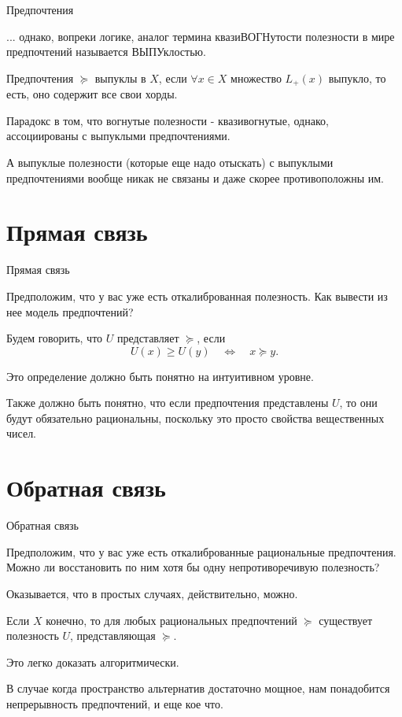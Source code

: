\documentclass{beamer}
\begin{document}
\begin{frame}{Предпочтения}

... однако, вопреки логике, аналог термина квазиВОГНутости полезности в мире предпочтений называется ВЫПУклостью.

\begin{definition}
Предпочтения $\succcurlyeq$ \alert{выпуклы} в $X$, если $\forall x \in X$ множество $L_{+}(x)$ выпукло, то есть, оно содержит все свои хорды. 
\end{definition}

Парадокс в том, что вогнутые полезности - квазивогнутые, однако, ассоциированы с выпуклыми предпочтениями. 

А выпуклые полезности (которые еще надо отыскать) с выпуклыми предпочтениями вообще никак не связаны и даже скорее противоположны им. 

\end{frame}

\section{Прямая связь}

\begin{frame}{Прямая связь}

Предположим, что у вас уже есть откалиброванная полезность. Как вывести из нее модель предпочтений?

\begin{definition}
Будем говорить, что $U$ \alert{представляет} $\succcurlyeq$, если
$$ U(x) \geqslant U(y) \quad \Leftrightarrow \quad  x \succcurlyeq y.$$
\end{definition}

Это определение должно быть понятно на интуитивном уровне. 

Также должно быть понятно, что если предпочтения представлены $U$, то они будут обязательно рациональны, поскольку это просто свойства вещественных чисел.

\end{frame}

\section{Обратная связь}

\begin{frame}{Обратная связь}

Предположим, что у вас уже есть откалиброванные рациональные предпочтения. Можно ли восстановить по ним хотя бы одну непротиворечивую полезность? 

Оказывается, что в простых случаях, действительно, можно.

\begin{lemma}
Если $X$ конечно, то для любых рациональных предпочтений $\succcurlyeq$ существует полезность $U$, представляющая $\succcurlyeq$.
\end{lemma}

Это легко доказать алгоритмически.

В случае когда пространство альтернатив достаточно мощное, нам понадобится непрерывность предпочтений, и еще кое что.

\end{frame}
\end{document}
